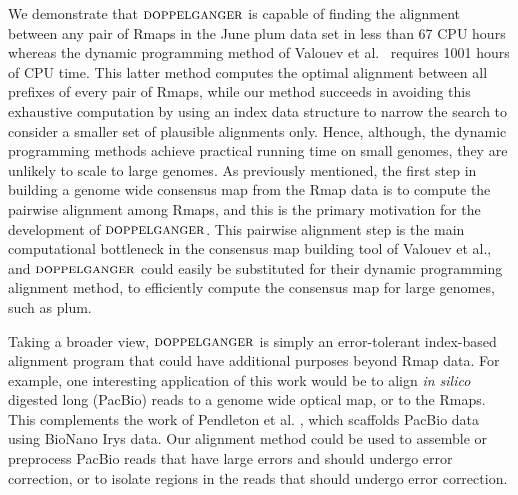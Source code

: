 \label{sec-discussion}

We demonstrate that $\mbox{\rm {\sc doppelganger}}$ is capable of finding the alignment between any pair of  Rmaps in the June plum data set in less than 67 CPU hours whereas the dynamic programming method of Valouev et al.~\cite{Valouev06} requires 1001 hours of CPU time. This latter method computes the optimal alignment between all prefixes of every pair of Rmaps, while our method succeeds in avoiding this exhaustive computation by using an index data structure to narrow the search to consider a smaller set of plausible alignments only. Hence, although, the dynamic programming methods achieve practical running time on small genomes, they are unlikely to scale to large genomes.   As previously mentioned, the first step in building a genome wide consensus map from the Rmap data is to compute the pairwise alignment among Rmaps, and this is the primary motivation for the development of $\mbox{\rm {\sc doppelganger}}$. This pairwise alignment step is the main computational bottleneck in the consensus map building tool of Valouev et al., and $\mbox{\rm {\sc doppelganger}}$ could easily be substituted for their dynamic programming alignment method, to efficiently compute the consensus map for large genomes, such as plum. 


Taking a broader view, $\mbox{\rm {\sc doppelganger}}$ is simply an error-tolerant index-based alignment program that could have additional purposes beyond Rmap data.  For example, one interesting application of this work would be to align {\em in silico} digested long (PacBio) reads to a genome wide optical map, or to the Rmaps.  This complements the work of  Pendleton et al. \cite{ali}, which scaffolds PacBio data using BioNano Irys data.  Our alignment method could be used to assemble or preprocess PacBio reads that have large errors and should undergo error correction, or to isolate regions in the reads that should undergo error correction.  


